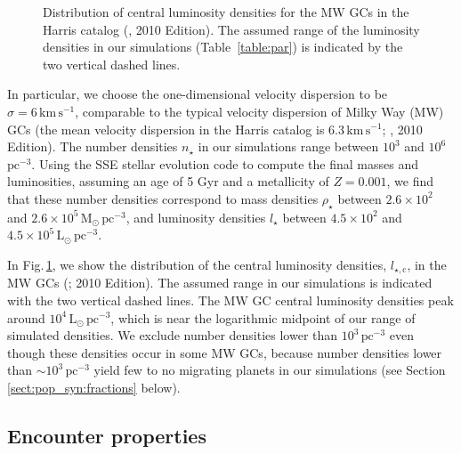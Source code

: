 \documentclass[iop,usenatbib]{emulateapj}
\renewcommand{\S}{Section}
\newcommand{\F}{Fig.}
\newcommand{\msun}{\mathrm{M}_\odot}
\newcommand{\lsun}{\mathrm{L}_\odot}
\begin{document}
\begin{figure}
\center
\iftoggle{ApJFigs}{
\texttt{[image: harris.eps]}
}{
\texttt{[image: figs/harris.eps]}
}
\caption { Distribution of central luminosity densities for the MW GCs in the Harris catalog (\citealt{1996AJ....112.1487H}, 2010 Edition). The assumed range of the luminosity densities in our simulations (Table~\ref{table:par}) is indicated by the two vertical dashed lines. }
\label{fig:harris}
\end{figure}

In particular, we choose the one-dimensional velocity dispersion to be $\sigma=6\,\mathrm{km\,s^{-1}}$, comparable to the typical velocity dispersion of Milky Way (MW) GCs (the mean velocity dispersion in the Harris catalog is $6.3\,\mathrm{km\,s^{-1}}$; \citealt{1996AJ....112.1487H}, 2010 Edition). The number densities $n_\star$ in our simulations range between $10^3$ and $10^{6}$ $\mathrm{pc^{-3}}$. Using the \textsc{SSE} stellar evolution code \citep{2000MNRAS.315..543H} to compute the final masses and luminosities, assuming an age of 5 Gyr and a metallicity of $Z=0.001$, we find that these number densities correspond to mass densities $\rho_\star$ between $2.6\times10^2$ and $2.6 \times 10^5\,\msun\,\mathrm{pc^{-3}}$, and luminosity densities $l_\star$ between $4.5 \times10^2$ and $4.5 \times 10^5 \, \lsun \, \mathrm{pc^{-3}}$. 

In \F\,\ref{fig:harris}, we show the distribution of the central luminosity densities, $l_{\star,\mathrm{c}}$, in the MW GCs (\citealt{1996AJ....112.1487H}; 2010 Edition). The assumed range in our simulations is indicated with the two vertical dashed lines. The MW GC central luminosity densities peak around $10^4 \, \lsun\,\mathrm{pc^{-3}}$, which is near the logarithmic midpoint of our range of simulated densities. We exclude number densities lower than $10^3 \, \mathrm{pc^{-3}}$ even though these densities occur in some MW GCs, because number densities lower than $\sim 10^3 \, \mathrm{pc^{-3}}$ yield few to no migrating planets in our simulations (see \S\,\ref{sect:pop_syn:fractions} below). 


\subsection{Encounter properties}
\label{sect:pop_syn:enc_prop}
\end{document}
